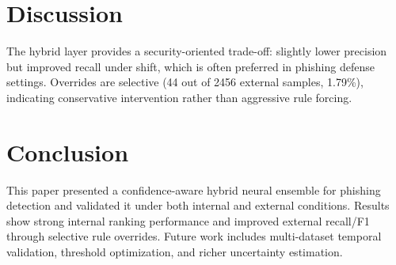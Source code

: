 ﻿\documentclass[conference]{IEEEtran}
\begin{document}
\section{Discussion}
The hybrid layer provides a security-oriented trade-off: slightly lower precision but improved recall under shift, which is often preferred in phishing defense settings. Overrides are selective (44 out of 2456 external samples, 1.79\%), indicating conservative intervention rather than aggressive rule forcing.

\section{Conclusion}
This paper presented a confidence-aware hybrid neural ensemble for phishing detection and validated it under both internal and external conditions. Results show strong internal ranking performance and improved external recall/F1 through selective rule overrides. Future work includes multi-dataset temporal validation, threshold optimization, and richer uncertainty estimation.

\nocite{*}


\end{document}
